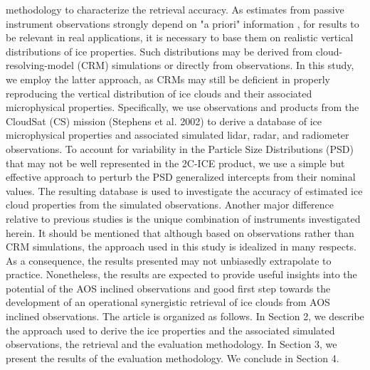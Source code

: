 \documentclass{ametsocV6.1}
\begin{document}
methodology to characterize the retrieval accuracy. As estimates from passive instrument 
observations strongly depend on "a priori" information \citep{rodgers2000inverse}, for results to be 
relevant in real applications, it is necessary to base them on realistic vertical distributions of 
ice properties.  Such distributions may be derived from cloud-resolving-model (CRM) simulations 
\citep{pfreundschuh2020synergistic,liu2022assessing} or directly from observations.  In this study, we employ the latter 
approach, as CRMs may still be deficient in properly reproducing the vertical distribution of ice 
clouds and their associated microphysical properties.  Specifically, we use observations and
products from the CloudSat (CS) mission (Stephens et al. 2002) to derive a database of ice microphysical
properties and associated simulated lidar, radar, and radiometer observations.  To account for variability in 
the Particle Size Distributions (PSD) that may not be well represented in the 2C-ICE product, we use a simple
but effective approach to perturb the PSD generalized intercepts from their nominal values.
The resulting database is used to
investigate the accuracy of estimated ice cloud properties from the simulated observations. Another major
difference relative to previous studies is the unique combination of instruments investigated herein. It should be
mentioned that although based on observations rather than CRM simulations, the approach used in this study is
idealized in many respects. As a consequence, the results presented may not unbiasedly extrapolate to practice.
Nonetheless, the results are expected to provide useful insights into the potential of the AOS inclined observations and
good first step towards the development of an operational synergistic retrieval of ice clouds from AOS inclined observations.
The article is organized as follows.  In Section 2, we describe the approach used to derive the ice properties and
the associated simulated observations, the retrieval and the evaluation methodology.  In Section 3, we 
present the results of the evaluation methodology. We conclude in Section 4.

\end{document}
